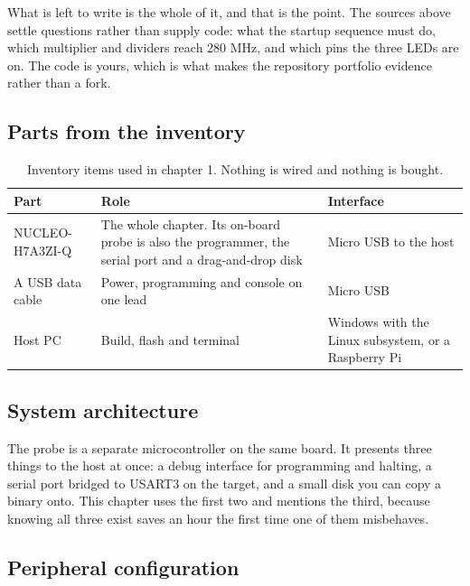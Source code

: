 What is left to write is the whole of it, and that is the point. The sources
above settle questions rather than supply code: what the startup sequence must
do, which multiplier and dividers reach 280 MHz, and which pins the three LEDs
are on. The code is yours, which is what makes the repository portfolio evidence
rather than a fork.

\subsection*{Parts from the inventory}

\begin{table}[H]\centering\small
\begin{tabular}{p{40mm}p{66mm}p{40mm}}
\toprule
Part & Role & Interface \\
\midrule
NUCLEO-H7A3ZI-Q & The whole chapter. Its on-board probe is also the programmer, the serial port and a drag-and-drop disk & Micro USB to the host \\
A USB data cable & Power, programming and console on one lead & Micro USB \\
Host PC & Build, flash and terminal & Windows with the Linux subsystem, or a Raspberry Pi \\
\bottomrule
\end{tabular}
\caption{Inventory items used in chapter 1. Nothing is wired and nothing is bought.}
\end{table}

\subsection*{System architecture}


The probe is a separate microcontroller on the same board. It presents three
things to the host at once: a debug interface for programming and halting, a
serial port bridged to USART3 on the target, and a small disk you can copy a
binary onto. This chapter uses the first two and mentions the third, because
knowing all three exist saves an hour the first time one of them misbehaves.

\subsection*{Peripheral configuration}

